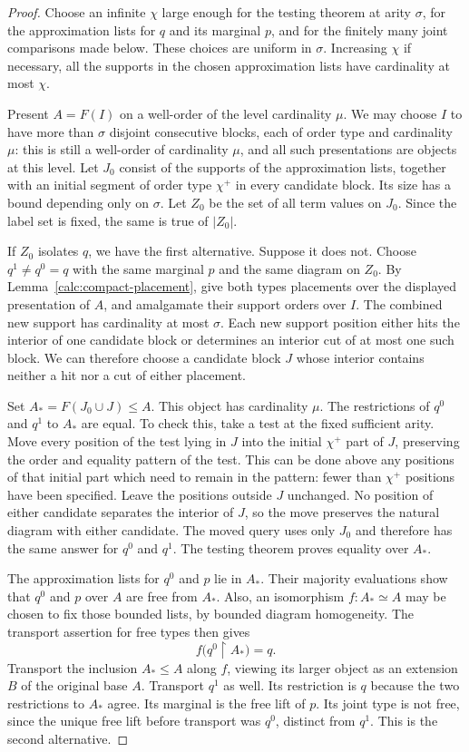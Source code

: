 \begin{proof}
Choose an infinite $\chi$ large enough for the testing theorem at arity
$\sigma$, for the approximation lists for $q$ and its marginal $p$, and
for the finitely many joint comparisons made below. These choices are
uniform in $\sigma$. Increasing $\chi$ if necessary, all the supports in
the chosen approximation lists have cardinality at most $\chi$.

Present $A=F(I)$ on a well-order of the level cardinality $\mu$. We may
choose $I$ to have more than $\sigma$ disjoint consecutive blocks, each
of order type and cardinality $\mu$: this is still a well-order of
cardinality $\mu$, and all such presentations are objects at this level.
Let $J_0$ consist of the supports of the approximation lists, together
with an initial segment of order type $\chi^+$ in every candidate block.
Its size has a bound depending only on $\sigma$. Let $Z_0$ be the set of
all term values on $J_0$. Since the label set is fixed, the same is true
of $|Z_0|$.

If $Z_0$ isolates $q$, we have the first alternative. Suppose it does not.
Choose $q^1\ne q^0=q$ with the same marginal $p$ and the same diagram on
$Z_0$. By Lemma~\ref{calc:compact-placement}, give both types placements
over the displayed presentation of $A$, and amalgamate their support
orders over $I$. The combined new support has cardinality at most
$\sigma$. Each new support position either hits the interior of one
candidate block or determines an interior cut of at most one such block.
We can therefore choose a candidate block $J$ whose interior contains
neither a hit nor a cut of either placement.

Set $A_*=F(J_0\cup J)\leq A$. This object has cardinality $\mu$. The
restrictions of $q^0$ and $q^1$ to $A_*$ are equal. To check this, take a
test at the fixed sufficient arity. Move every position of the test
lying in $J$ into the initial $\chi^+$ part of $J$, preserving the order
and equality pattern of the test. This can be done above any positions
of that initial part which need to remain in the pattern: fewer than
$\chi^+$ positions have been specified. Leave the positions outside
$J$ unchanged. No position of either candidate separates the interior
of $J$, so the move preserves the natural diagram with either candidate.
The moved query uses only $J_0$ and therefore has the same answer for
$q^0$ and $q^1$. The testing theorem proves equality over $A_*$.

The approximation lists for $q^0$ and $p$ lie in $A_*$. Their majority
evaluations show that $q^0$ and $p$ over $A$ are free from $A_*$. Also,
an isomorphism $f:A_*\simeq A$ may be chosen to fix those bounded lists,
by bounded diagram homogeneity. The transport assertion for free types
then gives
\[
 f\bigl(q^0\mathbin{\upharpoonright}A_*\bigr)=q.
\]
Transport the inclusion $A_*\leq A$ along $f$, viewing its larger object
as an extension $B$ of the original base $A$. Transport $q^1$ as well.
Its restriction is $q$ because the two restrictions to $A_*$ agree. Its
marginal is the free lift of $p$. Its joint type is not free, since the
unique free lift before transport was $q^0$, distinct from $q^1$.
This is the second alternative.


\end{proof}
